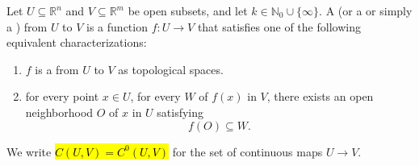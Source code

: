 \begin{definition} \label{definition:continuous_map_between_open_subsets_of_euclidean_spaces}
Let $U \subseteq \mathbb{R}^n$ and $V \subseteq \mathbb{R}^m$ be open subsets, and let $k \in \mathbb{N}_0 \cup \{\infty\}$.
A  (or a  or simply a ) from $U$ to $V$ is a function $f : U \to V$ that satisfies one of the following equivalent characterizations:
\begin{enumerate}
    \item $f$ is a  from $U$ to $V$ as topological spaces.
    \item for every point $x \in U$, for every  $W$ of $f(x)$ in $V$, there exists an open neighborhood $O$ of $x$ in $U$ satisfying
    $$ f(O) \subseteq W.  $$
\end{enumerate}
We write \hl{$C(U,V) = C^0(U, V)$} for the set of continuous maps $U \to V$.
\end{definition}
